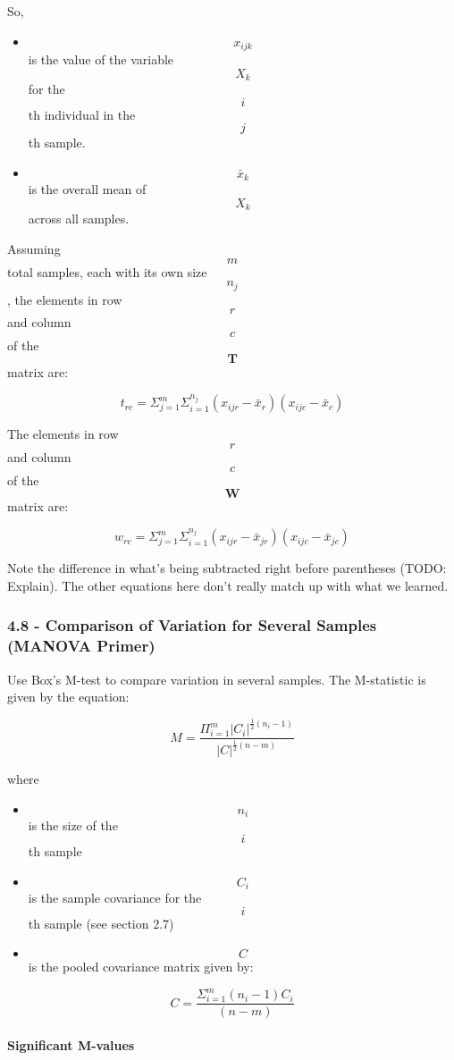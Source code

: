 \documentclass[]{article}
\providecommand{\tightlist}{%
  \setlength{\itemsep}{0pt}\setlength{\parskip}{0pt}}
\let\oldparagraph\paragraph
\renewcommand{\paragraph}[1]{\oldparagraph{#1}\mbox{}}
\begin{document}
So,

\begin{itemize}
\tightlist
\item
  \[x_{ijk}\] is the value of the variable \[X_k\] for the \[i\]th
  individual in the \[j\]th sample.
\item
  \[\bar{x}_k\] is the overall mean of \[X_k\] across all samples.
\end{itemize}

Assuming \[m\] total samples, each with its own size \[n_j\], the
elements in row \[r\] and column \[c\] of the \[\textbf{T}\] matrix are:

\[t_{rc} = \Sigma_{j = 1}^m \Sigma_{i = 1}^{n_j} (x_{ijr} - \bar{x}_r)(x_{ijc} - \bar{x}_c)\]

The elements in row \[r\] and column \[c\] of the \[\textbf{W}\] matrix
are:

\[w_{rc} = \Sigma_{j = 1}^m \Sigma_{i = 1}^{n_j} (x_{ijr} - \bar{x}_{jr})(x_{ijc} - \bar{x}_{jc})\]

Note the difference in what's being subtracted right before parentheses
(TODO: Explain). The other equations here don't really match up with
what we learned.

\hypertarget{comparison-of-variation-for-several-samples-manova-primer}{%
\subsubsection{4.8 - Comparison of Variation for Several Samples (MANOVA
Primer)}\label{comparison-of-variation-for-several-samples-manova-primer}}

Use Box's M-test to compare variation in several samples. The
M-statistic is given by the equation:

\[M = \frac{\Pi_{i = 1}^m | C_i | ^ {\frac{1}{2}(n_i - 1)}} {| C | ^ {\frac{1}{2} (n - m)}}\]

where

\begin{itemize}
\tightlist
\item
  \[n_i\] is the size of the \[i\]th sample
\item
  \[C_i\] is the sample covariance for the \[i\]th sample (see section
  2.7)
\item
  \[C\] is the pooled covariance matrix given by:
\end{itemize}

\[C = \frac{\Sigma_{i = 1}^m (n_i - 1) C_i}{(n - m)}\]

\hypertarget{significant-m-values}{%
\paragraph{Significant M-values}\label{significant-m-values}}
\end{document}
